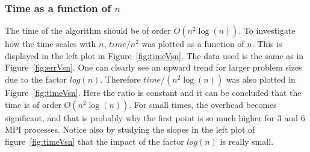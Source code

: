 \subsubsection{Time as a function of $n$}
The time of the algorithm should be of order $O(n^2 \log(n))$. To investigate how the time scales with $n$, $time/n^2$ was plotted as a function of $n$. This is displayed in the left plot in Figure~\ref{fig:timeVsn}. The data used is the same as in Figure~\ref{fig:errVsn}. One can clearly see an upward trend for larger problem sizes due to the factor $log(n)$. Therefore $time/(n^2 \log(n))$ was also plotted in Figure~\ref{fig:timeVsn}. Here the ratio is constant and it can be concluded that the time is of order $O(n^2 \log(n))$. For small times, the overhead becomes significant, and that is probably why the first point is so much higher for 3 and 6 MPI processes. Notice also by studying the slopes in the left plot of figure~\ref{fig:timeVsn} that the impact of the factor $log(n)$ is really small.  
